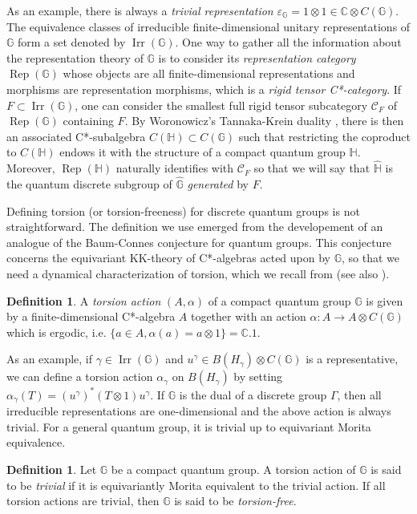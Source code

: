 \documentclass[a4paper, 11pt]{amsart}
\theoremstyle{plain}
\theoremstyle{definition}
\newtheorem{de}[thm]{Definition}
\theoremstyle{remark}
\DeclareMathOperator{\Irr}{Irr}
\DeclareMathOperator{\Rep}{Rep}
\newcommand{\C}{\mathbb{C}}
\newcommand{\CC}{\mathcal{C}}
\newcommand{\G}{\mathbb{G}}
\newcommand{\HH}{\mathbb{H}}
\begin{document}
As an example, there is always a \emph{trivial representation} $\varepsilon_{\G} = 1\otimes 1\in \C\otimes C(\G)$. The equivalence classes of irreducible finite-dimensional unitary representations of $\G$ form a set denoted by $\Irr(\G)$. One way to gather all the information about the representation theory of $\G$ is to consider its \emph{representation category} $\Rep(\G)$ whose objects are all finite-dimensional representations and morphisms are representation morphisms, which is a \emph{rigid tensor C*-category}. If $F\subset \Irr(\G)$, one can consider the smallest full rigid tensor subcategory $\CC_{F}$ of $\Rep(\G)$ containing $F$. By Woronowicz's Tannaka-Krein duality \cite{woronowicz1988tannaka}, there is then an associated C*-subalgebra $C(\HH)\subset C(\G)$ such that restricting the coproduct to $C(\HH)$ endows it with the structure of a compact quantum group $\HH$. Moreover, $\Rep(\HH)$ naturally identifies with $\CC_{F}$ so that we will say that $\widehat{\HH}$ is the quantum discrete subgroup of $\widehat{\G}$ \emph{generated} by $F$.

Defining torsion (or torsion-freeness) for discrete quantum groups is not straightforward. The definition we use emerged from the developement of an analogue of the Baum-Connes conjecture for quantum groups. This conjecture concerns the equivariant KK-theory of C*-algebras acted upon by $\G$, so that we need a dynamical characterization of torsion, which we recall from \cite{meyer2008homological} (see also \cite{voigt2015structure}).

\begin{de}
A \emph{torsion action} $(A, \alpha)$ of a compact quantum group $\G$ is given by a finite-dimensional C*-algebra $A$ together with an action $\alpha : A\rightarrow A\otimes C(\G)$ which is ergodic, i.e. $\{a\in A, \alpha(a) = a\otimes 1\}=\C.1$.
\end{de}

As an example, if $\gamma\in \Irr(\G)$ and $u^{\gamma}\in B(H_{\gamma})\otimes C(\G)$ is a representative, we can define a torsion action $\alpha_{\gamma}$ on $B(H_{\gamma})$ by setting $\alpha_{\gamma}(T) = (u^{\gamma})^{*}(T\otimes 1)u^{\gamma}$. If $\G$ is the dual of a discrete group $\Gamma$, then all irreducible representations are one-dimensional and the above action is always trivial. For a general quantum group, it is trivial up to equivariant Morita equivalence.

\begin{de}
Let $\G$ be a compact quantum group. A torsion action of $\G$ is said to be \emph{trivial} if it is equivariantly Morita equivalent to the trivial action. If all torsion actions are trivial, then $\G$ is said to be \emph{torsion-free}.
\end{de}
\end{document}
